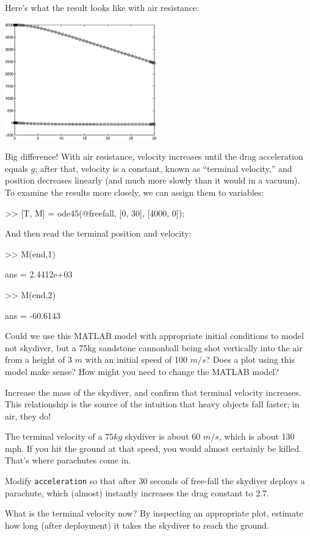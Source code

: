 \documentclass[
]{book}
\numberwithin{Answer}{chapter}
\numberwithin{Exercise}{chapter}
\begin{document}
Here's what the result looks like with air resistance:

\beforefig \centerline{\includegraphics[height=2in]{figs/freefall2.eps}}

Big difference!  With air resistance, velocity increases until
the drag acceleration equals $g$; after that, velocity is a constant,
known as ``terminal velocity,'' and position decreases linearly
(and much more slowly than it would in a vacuum).  To examine
the results more closely, we can assign them to variables:


\begin{code}
>> [T, M] = ode45(@freefall, [0, 30], [4000, 0]);
\end{code}

And then read the terminal position and velocity:

\begin{code}
>> M(end,1)

ans = 2.4412e+03          %

>> M(end,2)

ans = -60.6143            %
\end{code}

\begin{ex}
	Could we use this MATLAB model with appropriate initial conditions 
	to model not skydiver, but a  
	75kg sandstone cannonball being shot vertically into the air from a height of
	3 $m$ with an initial speed of 100 $m/s$?  Does a plot using this model
	make sense?  How might you need to change the
	MATLAB model?
\end{ex}

\begin{ex}
Increase the mass of the skydiver, and confirm that
terminal velocity increases.  This relationship is the source of the
intuition that heavy objects fall faster; in air, they do!
\end{ex}

\begin{ex}
The terminal velocity of a $75
kg$ skydiver is about 60 $m/s$, which is about 130 mph.  If you hit
the ground at that speed, you would almost certainly be killed.
That's where parachutes come in.

Modify {\tt acceleration} so that after 30 seconds of
free-fall the skydiver deploys a parachute, which (almost) instantly
    increases the drag constant to 2.7. 

What is the terminal velocity now?  By inspecting an appropriate plot, estimate 
how long (after deployment)
it takes the skydiver to reach the ground.
\end{ex}
\end{document}

